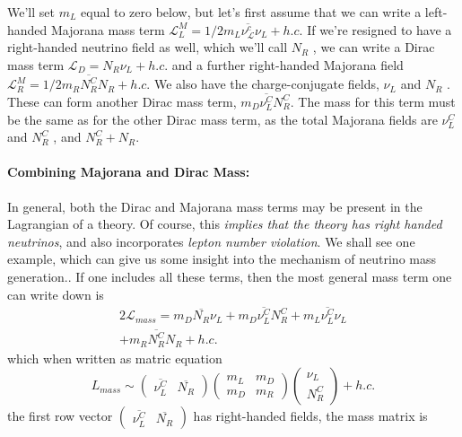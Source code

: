 We’ll set $m_L$ equal to zero below, but let’s first assume that we can write a left-handed Majorana mass term \(\mathcal{L}^M _L = 1/2 m_L \overline{\nu_\mathcal{L}^c}\nu_L + h.c\). If we’re resigned to have a right-handed neutrino field as well, which we’ll call $N_R$ , we can write a Dirac mass term $\mathcal{L}_D = N_R \nu _L + h.c$. and a further right-handed Majorana field \(\mathcal{L}_R ^M = 1/2 m_R \overline{N_R ^C}N_R +h.c\). We also have the charge-conjugate fields, $\nu_L$ and $N_R$ . These can form another Dirac mass term, $m_D \overline{\nu _L ^C} N_R^C$. The mass for this term must be the same as for the other Dirac mass term, as the total Majorana fields are \(\nu _L ^C\) and \(N_R^C\) , and \(N_R^C +N_R\).

\paragraph*{Combining Majorana and Dirac Mass:} In general, both the Dirac and Majorana mass terms may be present in the Lagrangian of a theory. Of course, this \textit{implies that the theory has right handed neutrinos}, and also incorporates \textit{lepton number violation}. We shall see one example, which can give us some insight into the mechanism of neutrino mass generation.. If one includes all these terms, then the most general mass term one can write down is
\begin{equation}
    \begin{aligned}
        2 \mathcal{L}_{mass} = m_D \overline{N_R}\nu _L + m_D \overline{\nu _L ^C} N_R^C + m_L \overline{\nu_L^C}\nu_L \\
        + m_R \overline{N_R ^C}N_R + h.c.
    \end{aligned}
\end{equation}
which when written as matric equation 
\begin{equation}
    L_{mass} \sim \begin{pmatrix}\overline{\nu_L^C} & \overline{N_R}\end{pmatrix} \begin{pmatrix}
        m_L & m_D\\
        m_D & m_R
    \end{pmatrix}\begin{pmatrix}
        \nu_L\\N_R ^C
    \end{pmatrix} + h.c.
\end{equation}
the first row vector \(\begin{pmatrix}\overline{\nu_L^C} & \overline{N_R}\end{pmatrix}\) has right-handed fields, the mass matrix is 
